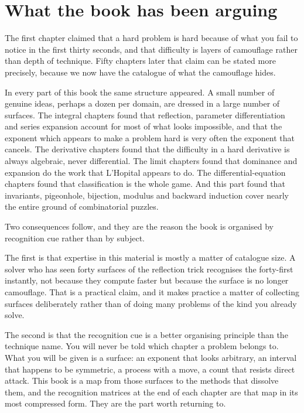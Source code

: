 \section{What the book has been arguing}

The first chapter claimed that a hard problem is hard because of what you fail to notice in the first thirty seconds, and that difficulty is layers of camouflage rather than depth of technique. Fifty chapters later that claim can be stated more precisely, because we now have the catalogue of what the camouflage hides.

In every part of this book the same structure appeared. A small number of genuine ideas, perhaps a dozen per domain, are dressed in a large number of surfaces. The integral chapters found that reflection, parameter differentiation and series expansion account for most of what looks impossible, and that the exponent which appears to make a problem hard is very often the exponent that cancels. The derivative chapters found that the difficulty in a hard derivative is always algebraic, never differential. The limit chapters found that dominance and expansion do the work that L'Hopital appears to do. The differential-equation chapters found that classification is the whole game. And this part found that invariants, pigeonhole, bijection, modulus and backward induction cover nearly the entire ground of combinatorial puzzles.

Two consequences follow, and they are the reason the book is organised by recognition cue rather than by subject.

The first is that expertise in this material is mostly a matter of catalogue size. A solver who has seen forty surfaces of the reflection trick recognises the forty-first instantly, not because they compute faster but because the surface is no longer camouflage. That is a practical claim, and it makes practice a matter of collecting surfaces deliberately rather than of doing many problems of the kind you already solve.

The second is that the recognition cue is a better organising principle than the technique name. You will never be told which chapter a problem belongs to. What you will be given is a surface: an exponent that looks arbitrary, an interval that happens to be symmetric, a process with a move, a count that resists direct attack. This book is a map from those surfaces to the methods that dissolve them, and the recognition matrices at the end of each chapter are that map in its most compressed form. They are the part worth returning to.

